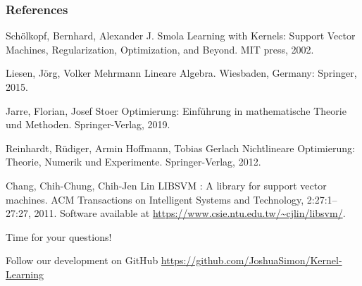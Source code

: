 \documentclass{beamer}
\begin{document}
\begin{frame}
    \frametitle{References}
    \footnotesize{
        \begin{thebibliography}{99} %
             Schölkopf, Bernhard, Alexander J. Smola
            \newblock Learning with Kernels: Support Vector Machines, Regularization, Optimization, and Beyond. MIT press, 2002.

             Liesen, Jörg, Volker Mehrmann
            \newblock Lineare Algebra. Wiesbaden, Germany: Springer, 2015.

             Jarre, Florian, Josef Stoer
            \newblock Optimierung: Einführung in mathematische Theorie und Methoden. Springer-Verlag, 2019.

             Reinhardt, Rüdiger, Armin Hoffmann, Tobias Gerlach
            \newblock Nichtlineare Optimierung: Theorie, Numerik und Experimente. Springer-Verlag, 2012.

             Chang, Chih-Chung, Chih-Jen Lin
            \newblock LIBSVM : A library for support vector machines. ACM Transactions on Intelligent Systems and Technology, 2:27:1--27:27, 2011. Software available at \url{https://www.csie.ntu.edu.tw/~cjlin/libsvm/}.

        \end{thebibliography}
    }
\end{frame}


\begin{frame}
    \Huge{\centerline{Time for your questions!}}
    \bigskip
    \bigskip
    \bigskip
    \bigskip

    \normalsize
    Follow our development on GitHub  
    \url{https://github.com/JoshuaSimon/Kernel-Learning}
    
\end{frame}

\end{document}
